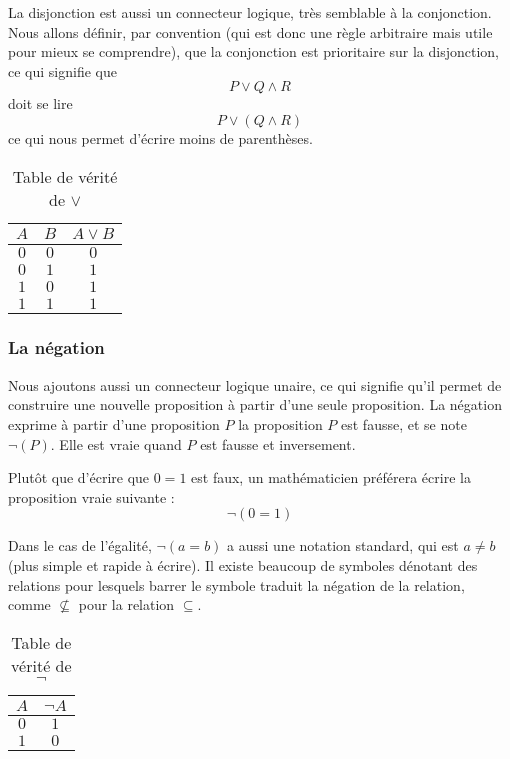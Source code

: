 La disjonction est aussi un connecteur logique, très semblable à la conjonction. Nous allons définir, par convention (qui est donc une règle arbitraire mais utile pour mieux se comprendre), que la conjonction est prioritaire sur la disjonction, ce qui signifie que $$P\lor Q \land R$$ doit se lire $$P\lor (Q\land R)$$ ce qui nous permet d'écrire moins de parenthèses.

\begin{table}[ht]
            \centering
            \begin{tabular}{| c | c | c |}
                \hline
                $A$ & $B$ & $A\lor B$\\
                \hline
                $0$ & $0$ & $0$\\
                $0$ & $1$ & $1$\\
                $1$ & $0$ & $1$\\
                $1$ & $1$ & $1$\\
                \hline
            \end{tabular}
            \caption{Table de vérité de $\lor$}
    \end{table}

\subsubsection{La négation}

Nous ajoutons aussi un connecteur logique unaire, ce qui signifie qu'il permet de construire une nouvelle proposition à partir d'une seule proposition. La négation exprime à partir d'une proposition $P$ la proposition \og $P$ est fausse\fg{}, et se note $\lnot (P)$. Elle est vraie quand $P$ est fausse et inversement.

\begin{expl}
    Plutôt que d'écrire que $0=1$ est faux, un mathématicien préférera écrire la proposition vraie suivante :
    $$\lnot (0=1)$$
    
    Dans le cas de l'égalité, $\lnot (a=b)$ a aussi une notation standard, qui est $a\neq b$ (plus simple et rapide à écrire). Il existe beaucoup de symboles dénotant des relations pour lesquels barrer le symbole traduit la négation de la relation, comme $\not\subseteq$ pour la relation $\subseteq$.
\end{expl}

\begin{table}[ht]
            \centering
            \begin{tabular}{| c | c |}
                \hline
                $A$ & $\lnot A$\\
                \hline
                $0$ & $1$\\
                $1$ & $0$\\
                \hline
            \end{tabular}
            \caption{Table de vérité de $\lnot$}
    \end{table}
    
